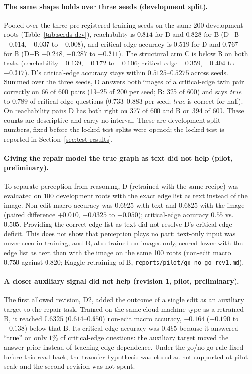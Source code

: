 \paragraph{The same shape holds over three seeds (development split).}
Pooled over the three pre-registered training seeds on the same 200 development roots
(Table~\ref{tab:seeds-dev}), reachability is $0.814$ for D and $0.828$ for B (D$-$B $-0.014$,
$-0.037$ to $+0.008$), and critical-edge accuracy is $0.519$ for D and $0.767$ for B (D$-$B
$-0.248$, $-0.287$ to $-0.211$). The structural arm C is below B on both tasks (reachability
$-0.139$, $-0.172$ to $-0.106$; critical edge $-0.359$, $-0.404$ to $-0.317$). D's critical-edge
accuracy stays within $0.5125$--$0.5275$ across seeds. Summed over the three seeds, D answers both
images of a critical-edge twin pair correctly on 66 of 600 pairs (19--25 of 200 per seed; B: 325
of 600) and says \emph{true} to $0.789$ of critical-edge questions ($0.733$--$0.883$ per seed;
\emph{true} is correct for half). On reachability pairs D has both right on 377 of 600 and B on
394 of 600. These counts are descriptive and carry no interval. These are development-split numbers, fixed before
the locked test splits were opened; the locked test is reported in Section~\ref{sec:test-results}.

\paragraph{Giving the repair model the true graph as text did not help (pilot, preliminary).}
To separate perception from reasoning, D (retrained with the same recipe) was evaluated on 100
development roots with the exact edge list as text instead of the image. Non-edit macro accuracy
was $0.6925$ with text and $0.6825$ with the image (paired difference $+0.010$, $-0.0325$ to
$+0.050$); critical-edge accuracy $0.55$ vs.\ $0.505$. Providing the correct edge list as text
did not resolve D's critical-edge deficit. This does not show that perception plays no part:
text-only input was never seen in training, and B, also trained on images only, scored lower with
the edge list as text than with the image on the same 100 roots (non-edit macro $0.750$ against
$0.820$; Kaggle retraining of B, \texttt{reports/pilot/go\_no\_go\_rev1.md}).

\paragraph{A closer auxiliary signal did not help (revision 1, pilot, preliminary).}
The first allowed revision, D2, added the outcome of a single edit as an auxiliary target to the
repair task. Trained on the same cloud machine type as a retrained B, it reached $0.6325$
($0.614$--$0.650$) non-edit macro accuracy, $-0.164$ ($-0.190$ to $-0.138$) below that B. Its
critical-edge accuracy was $0.495$ because it answered ``true'' on only $1\%$ of critical-edge
questions: the auxiliary target moved the answer prior instead of teaching edge dependence.
Under the go/no-go rule fixed before this read-back, the transfer hypothesis was closed as not
supported at pilot scale and the second revision was not spent.

